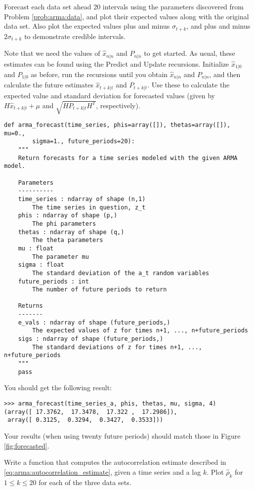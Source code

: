 \label{prob:arma:forecast}
Forecast each data set ahead 20 intervals using the parameters discovered from
Problem \ref{prob:arma:data}, and plot their expected values along with the
original data set. Also plot the expected values plus and minus $\sigma_{t+k}$,
and plus and minus $2\sigma_{t+k}$ to demonstrate credible intervals.

Note that we need the values of $\hat{x}_{n|n}$ and $P_{n|n}$ to get started.
As usual, these estimates can be found using the Predict and Update recursions.
Initialize $\hat{x}_{1|0}$ and $P_{1|0}$ as before, run the recursions until you
obtain $\hat{x}_{n|n}$ and $P_{n|n}$, and then calculate the future
estimates $\hat{x}_{t+k|t}$ and $P_{t+k|t}$. Use these to calculate the expected
value and standard deviation for forecasted values (given by $H\hat{x}_{t+k|t} + \mu$
and $\sqrt{HP_{t+k|t}H^T}$, respectively).
\begin{lstlisting}
def arma_forecast(time_series, phis=array([]), thetas=array([]), mu=0.,
        sigma=1., future_periods=20):
    """
    Return forecasts for a time series modeled with the given ARMA model.

    Parameters
    ----------
    time_series : ndarray of shape (n,1)
        The time series in question, z_t
    phis : ndarray of shape (p,)
        The phi parameters
    thetas : ndarray of shape (q,)
        The theta parameters
    mu : float
        The parameter mu
    sigma : float
        The standard deviation of the a_t random variables
    future_periods : int
        The number of future periods to return

    Returns
    -------
    e_vals : ndarray of shape (future_periods,)
        The expected values of z for times n+1, ..., n+future_periods
    sigs : ndarray of shape (future_periods,)
        The standard deviations of z for times n+1, ..., n+future_periods
    """
    pass
\end{lstlisting}

\vspace{3mm} \noindent
You should get the following result:
\begin{lstlisting}
>>> arma_forecast(time_series_a, phis, thetas, mu, sigma, 4)
(array([ 17.3762,  17.3478,  17.322 ,  17.2986]),
 array([ 0.3125,  0.3294,  0.3427,  0.3533]))
\end{lstlisting}

\vspace{3mm} \noindent
Your results (when using twenty future periods) should match those in Figure \ref{fig:forecasted}.

\label{prob:arma:autocorrelation}
Write a function that computes the autocorrelation estimate described in
\ref{eq:arma:autocorrelation_estimate}, given a time series and a lag $k$.
Plot $\hat{\rho}_k$ for $1 \leq k \leq 20$ for each of the three data sets.
